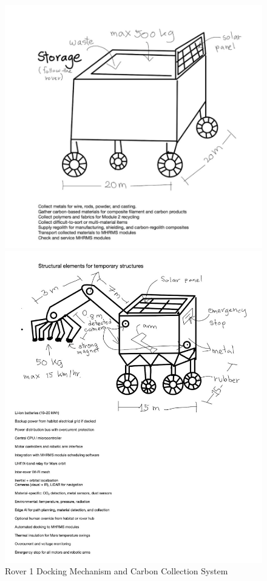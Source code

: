 \documentclass[12pt, a4paper]{article}
\begin{document}
\begin{figure}[h!]
    \centering
    \begin{minipage}{0.45\textwidth}
        \centering
        \includegraphics[width=\textwidth]{rover1.png}
        \caption{Rover 1 Docking Mechanism and Carbon Collection System}
        \label{fig:rover1_design}
    \end{minipage}
    \hfill
    \begin{minipage}{0.45\textwidth}
        \centering
        \includegraphics[width=\textwidth]{rover2.png}

\end{minipage}
\end{figure}
\end{document}
